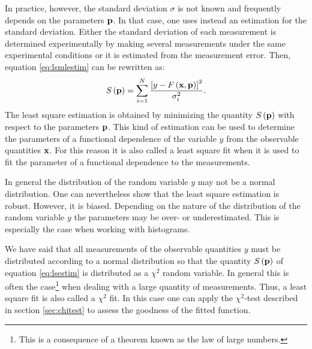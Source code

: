 \documentclass[twoside]{book}
\begin{document}
In practice, however, the standard deviation $\sigma$ is not known
and frequently depends on the parameters ${\bf p}$. In that case,
one uses instead an estimation for the standard deviation. Either
the standard deviation of each measurement is determined
experimentally by making several measurements under the same
experimental conditions or it is estimated from the measurement
error. Then, equation \ref{eq:lsmlestim} can be rewritten as:
\begin{equation}
\label{eq:lsestim}
  S\left({\bf p}\right)=\sum_{i=1}^N {
  \left[y-F\left({\bf x},{\bf p}\right)\right]^2\over \sigma_i^2}.
\end{equation}
The least square estimation is obtained by minimizing the quantity
$S\left({\bf p}\right)$ with respect to the parameters ${\bf p}$.
This kind of estimation can be used to determine the parameters of
a functional dependence of the variable $y$ from the observable
quantities ${\bf x}$. For this reason it is also called a least
square fit when it is used to fit the parameter of a functional
dependence to the measurements.

In general the distribution of the random variable $y$ may not be
a normal distribution. One can nevertheless show that the least
square estimation is robust. However, it is biased. Depending on
the nature of the distribution of the random variable $y$ the
parameters may be over- or underestimated. This is especially the
case when working with histograms.

We have said that all measurements of the observable quantities
$y$ must be distributed according to a normal distribution so that
the quantity $S\left({\bf p}\right)$ of equation \ref{eq:lsestim}
is distributed as a $\chi^2$ random variable. In general this is
often the case\footnote{This is a consequence of a theorem known
as the law of large numbers.} when dealing with a large quantity
of measurements. Thus, a least square fit is also called a
$\chi^2$ fit. In this case one can apply the $\chi^2$-test
described in section \ref{sec:chitest} to assess the goodness of
the fitted function.
\end{document}
